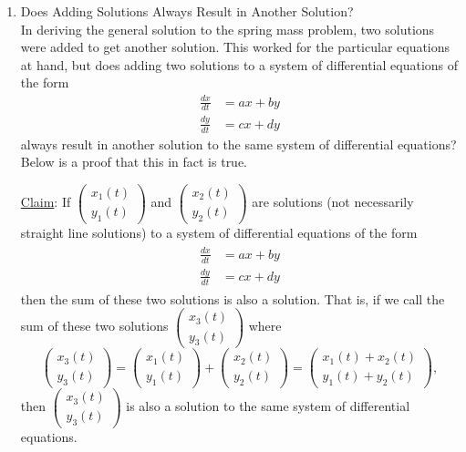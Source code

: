\begin{enumerate}
\item Does Adding Solutions Always Result in Another Solution? \\

In deriving the general solution to the spring mass problem, two solutions were added to get another solution. This worked for the particular equations at hand, but does adding two solutions to a system of differential equations of the form    
\begin{align*}
\frac{dx}{dt}&=ax+by\\ \frac{dy}{dt}&= cx+dy
\end{align*}
 always result in another solution to the same system of differential equations? Below is a proof that this in fact is true.

\noindent \underline{Claim}:
If  $\displaystyle \begin{pmatrix}
x_1(t)\\y_1(t)
\end{pmatrix}$  and $\displaystyle \begin{pmatrix}
x_2(t)\\y_2(t)
\end{pmatrix}$  are solutions (not necessarily straight line solutions) to a system of differential equations of the form  \begin{align*}\begin{split}
\frac{dx}{dt}&=ax+by\\ \frac{dy}{dt}&= cx+dy
\end{split}\end{align*}
 then the sum of these two solutions is also a solution. That is, if we call the sum of these two solutions  $\displaystyle \begin{pmatrix} x_3(t)\\y_3(t) \end{pmatrix}$ where 
 \[ \begin{pmatrix}
x_3(t)\\y_3(t)
\end{pmatrix}=\begin{pmatrix}
x_1(t)\\y_1(t)
\end{pmatrix}+\begin{pmatrix}
x_2(t)\\y_2(t)
\end{pmatrix}=\begin{pmatrix}
x_1(t)+x_2(t)\\y_1(t)+y_2(t)
\end{pmatrix},\]
 then  $\displaystyle \begin{pmatrix} x_3(t)\\y_3(t) \end{pmatrix}$  is also a solution to the same system of differential equations.  


\end{enumerate}
